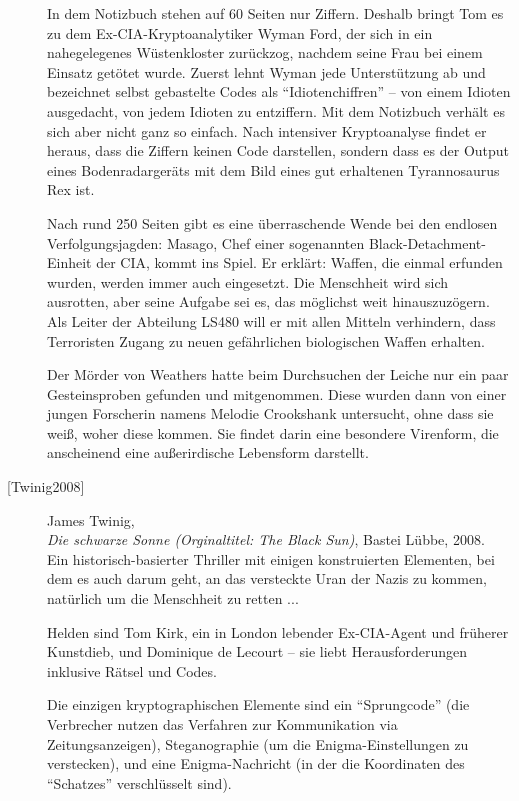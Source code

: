 \begin{refsegment}
\begin{description}
    In dem Notizbuch stehen auf 60 Seiten nur Ziffern. Deshalb bringt Tom es zu dem
    Ex-CIA-Kryptoanalytiker Wyman Ford, der sich in ein nahegelegenes Wüstenkloster
    zurückzog, nachdem seine Frau bei einem Einsatz getötet wurde.
    Zuerst lehnt Wyman jede Unterstützung ab und bezeichnet selbst gebastelte Codes
    als "`Idiotenchiffren"' -- von einem Idioten ausgedacht, von jedem Idioten zu
    entziffern. Mit dem Notizbuch verhält es sich aber nicht ganz so einfach. Nach
    intensiver Kryptoanalyse findet er heraus, dass die Ziffern keinen Code
    darstellen, sondern dass es der Output eines Bodenradargeräts mit dem Bild
    eines gut erhaltenen Tyrannosaurus Rex ist.

    Nach rund 250 Seiten gibt es eine überraschende Wende bei den endlosen
    Verfolgungsjagden: Masago, Chef einer sogenannten Black-Detachment-Einheit der CIA,
    kommt ins Spiel. Er erklärt: Waffen, die einmal erfunden wurden, werden immer auch
    eingesetzt. Die Menschheit wird sich ausrotten, aber seine Aufgabe sei es, das
    möglichst weit hinauszuzögern. Als Leiter der Abteilung LS480 will er mit allen
    Mitteln verhindern, dass Terroristen Zugang zu neuen gefährlichen biologischen
    Waffen erhalten.

    Der Mörder von Weathers hatte beim Durchsuchen der Leiche nur ein paar Gesteinsproben
    gefunden und mitgenommen. Diese wurden dann von einer jungen Forscherin namens Melodie
    Crookshank untersucht, ohne dass sie weiß, woher diese kommen. Sie findet darin eine
    besondere Virenform, die anscheinend eine außerirdische Lebensform darstellt.\\


\item[\textrm{[Twinig2008]}] 
    James Twinig, \\
    {\em Die schwarze Sonne (Orginaltitel: The Black Sun)}, Bastei Lübbe, 2008. \\
    Ein historisch-basierter Thriller mit einigen konstruierten Elementen, bei dem
    es auch darum geht, an das versteckte Uran der Nazis zu kommen, natürlich um die
    Menschheit zu retten ...

    Helden sind Tom Kirk, ein in London lebender Ex-CIA-Agent und früherer Kunstdieb,
    und Dominique de Lecourt -- sie liebt Herausforderungen inklusive Rätsel und Codes.

    Die einzigen kryptographischen Elemente sind ein "`Sprungcode"' (die Verbrecher
    nutzen das Verfahren zur Kommunikation via Zeitungsanzeigen), Steganographie
    (um die Enigma-Einstellungen zu verstecken), und eine Enigma-Nachricht (in der die
    Koordinaten des "`Schatzes"' verschlüsselt sind).


\end{description}
\end{refsegment}
